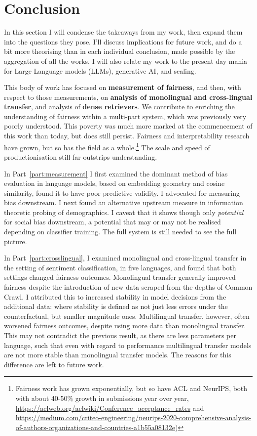 \chapter{Conclusion}\label{chapter:conclusion}

In this section I will condense the takeaways from my work, then expand them into the questions they pose. I'll discuss implications for future work, and do a bit more theorising than in each individual conclusion, made possible by the aggregation of all the works. I will also relate my work to the present day mania for Large Language models (LLMs), generative AI, and scaling.

This body of work has focused on \textbf{measurement of fairness}, and then, with respect to those measurements, on \textbf{analysis of monolingual and cross-lingual transfer}, and analysis of \textbf{dense retrievers}. We contribute to enriching the understanding of fairness within a multi-part system, which was previously very poorly understood. This poverty was much more marked at the commencement of this work than today, but does still persist. Fairness and interpretability research have grown, but so has the field as a whole.\footnote{Fairness work has grown exponentially, but so have ACL and NeurIPS, both with about 40-50\% growth in submissions year over year, \url{https://aclweb.org/aclwiki/Conference_acceptance_rates} and \url{https://medium.com/criteo-engineering/neurips-2020-comprehensive-analysis-of-authors-organizations-and-countries-a1b55a08132e})} The scale and speed of productionisation still far outstrips understanding. 

In Part~\ref{part:measurement} I first examined the dominant method of bias evaluation in language models, based on embedding geometry and cosine similarity, found it to have poor predictive validity. I advocated for measuring bias downstream. 
I next found an alternative upstream measure in information theoretic probing of demographics. I caveat that it shows though only \textit{potential} for social bias downstream, a potential that may or may not be realised depending on classifier training. The full system is still needed to see the full picture.

In Part~\ref{part:crosslingual}, I examined monolingual and cross-lingual transfer in the setting of sentiment classification, in five languages, and found that both settings changed fairness outcomes. Monolingual transfer generally improved fairness despite the introduction of new data scraped from the depths of Common Crawl. I attributed this to increased stability in model decisions from the additional data: where stability is defined as not just less errors under the counterfactual, but smaller magnitude ones. Multilingual transfer, however, often worsened fairness outcomes, despite using more data than monolingual transfer. This may not contradict the previous result, as there are less parameters per language, such that even with regard to performance multilingual transfer models are not more stable than monolingual transfer models. The reasons for this difference are left to future work. 

